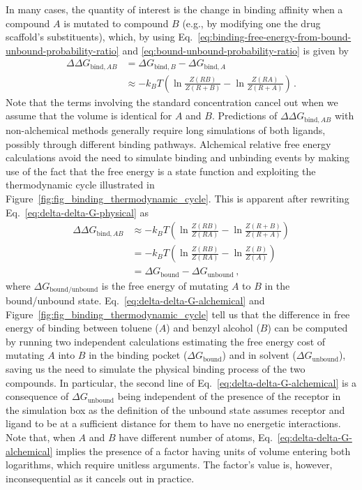 \documentclass[9pt,bestpractices]{livecoms}
\begin{document}
In many cases, the quantity of interest is the change in binding affinity when a compound $A$ is mutated to compound $B$ (e.g., by modifying one the drug scaffold's substituents), which, by using Eq.~\ref{eq:binding-free-energy-from-bound-unbound-probability-ratio} and \ref{eq:bound-unbound-probability-ratio} is given by
\begin{equation}\label{eq:delta-delta-G-physical}
\begin{split}
    \Delta \Delta G_{\mathrm{bind}, AB} &= \Delta G_{\mathrm{bind}, B} - \Delta G_{\mathrm{bind}, A} \\
    &\approx -k_BT \left( \ln \frac{Z(RB)}{Z(R+B)} - \ln \frac{Z(RA)}{Z(R+A)} \right) \, .
\end{split}
\end{equation}
Note that the terms involving the standard concentration cancel out when we assume that the volume is identical for $A$ and $B$.
Predictions of $\Delta \Delta G_{\mathrm{bind}, AB}$ with non-alchemical methods generally require long simulations of both ligands, possibly through different binding pathways.
Alchemical relative free energy calculations avoid the need to simulate binding and unbinding events by making use of the fact that the free energy is a state function and exploiting the thermodynamic cycle illustrated in Figure~\ref{fig:fig_binding_thermodynamic_cycle}.
This is apparent after rewriting Eq.~\ref{eq:delta-delta-G-physical} as
\begin{equation}\label{eq:delta-delta-G-alchemical}
\begin{split}
    \Delta \Delta G_{\mathrm{bind}, AB} &\approx -k_BT \left( \ln \frac{Z(RB)}{Z(RA)} - \ln \frac{Z(R+B)}{Z(R+A)} \right) \\
    &= -k_BT \left( \ln \frac{Z(RB)}{Z(RA)} - \ln \frac{Z(B)}{Z(A)} \right) \\
    &= \Delta G_{\mathrm{bound}} - \Delta G_{\mathrm{unbound}} \, ,
\end{split}
\end{equation}
where $\Delta G_{\mathrm{bound/unbound}}$ is the free energy of mutating $A$ to $B$ in the bound/unbound state.
Eq.~\ref{eq:delta-delta-G-alchemical} and Figure~\ref{fig:fig_binding_thermodynamic_cycle} tell us that the difference in free energy of binding between toluene ($A$) and benzyl alcohol ($B$) can be computed by running two independent calculations estimating the free energy cost of mutating $A$ into $B$ in the binding pocket ($\Delta G_{\mathrm{bound}}$) and in solvent ($\Delta G_{\mathrm{unbound}}$), saving us the need to simulate the physical binding process of the two compounds.
In particular, the second line of Eq.~\ref{eq:delta-delta-G-alchemical} is a consequence of $\Delta G_{\mathrm{unbound}}$ being independent of the presence of the receptor in the simulation box as the definition of the unbound state assumes receptor and ligand to be at a sufficient distance for them to have no energetic interactions.
Note that, when $A$ and $B$ have different number of atoms, Eq.~\ref{eq:delta-delta-G-alchemical} implies the presence of a factor having units of volume entering both logarithms, which require unitless arguments.
The factor's value is, however, inconsequential as it cancels out in practice.
\end{document}
